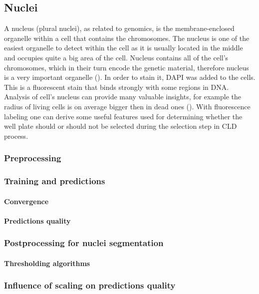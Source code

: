 \subsection{Nuclei}
    A nucleus (plural nuclei), as related to genomics, is the membrane-enclosed organelle within a cell that contains the chromosomes. The nucleus is one of the easiest organelle to detect within the cell as it is usually located in the middle and occupies quite a big area of the cell. Nucleus contains all of the cell's chromosomes, which in their turn encode the genetic material, therefore nucleus is a very important organelle (\cite{genomegov}). In order to stain it, DAPI was added to the cells. This is a fluorescent stain that binds strongly with some regions in DNA. Analysis of cell's nucleus can provide many valuable insights, for example the radius of living cells is on average bigger then in dead ones (\cite{Christiansen_2018}). With fluorescence labeling one can derive some useful features used for determining whether the well plate should or should not be selected during the selection step in CLD process.
    \subsubsection{Preprocessing}\label{section:nuclei-preprocessing}
        
    \subsubsection{Training and predictions}
        \paragraph{Convergence}
              
        \paragraph{Predictions quality}
              
    \subsubsection{Postprocessing for nuclei segmentation}
        
        \paragraph{Thresholding algorithms}
        
    \subsubsection{Influence of scaling on predictions quality}
        
